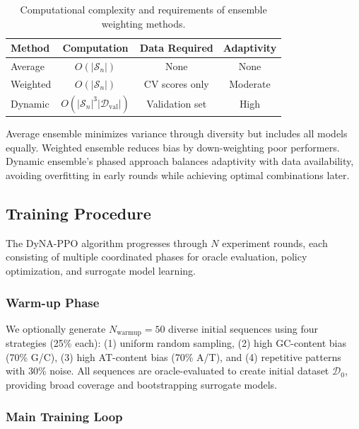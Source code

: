 \documentclass[conference]{IEEEtran}
\begin{document}
\begin{table}[h]
\centering
\begin{tabular}{lccc}
\hline
\textbf{Method} & \textbf{Computation} & \textbf{Data Required} & \textbf{Adaptivity} \\
\hline
Average & $O(|\mathcal{S}_n|)$ & None & None \\
Weighted & $O(|\mathcal{S}_n|)$ & CV scores only & Moderate \\
Dynamic & $O(|\mathcal{S}_n|^3 |\mathcal{D}_{\text{val}}|)$ & Validation set & High \\
\hline
\end{tabular}
\caption{Computational complexity and requirements of ensemble weighting methods.}
\end{table}

Average ensemble minimizes variance through diversity but includes all models equally. Weighted ensemble reduces bias by down-weighting poor performers. Dynamic ensemble's phased approach balances adaptivity with data availability, avoiding overfitting in early rounds while achieving optimal combinations later.









\subsection{Training Procedure}

The DyNA-PPO algorithm progresses through $N$ experiment rounds, each consisting of multiple coordinated phases for oracle evaluation, policy optimization, and surrogate model learning.

\subsubsection{Warm-up Phase}

We optionally generate $N_{\text{warmup}} = 50$ diverse initial sequences using four strategies (25\% each): (1) uniform random sampling, (2) high GC-content bias (70\% G/C), (3) high AT-content bias (70\% A/T), and (4) repetitive patterns with 30\% noise. All sequences are oracle-evaluated to create initial dataset $\mathcal{D}_0$, providing broad coverage and bootstrapping surrogate models.

\subsubsection{Main Training Loop}
\end{document}
